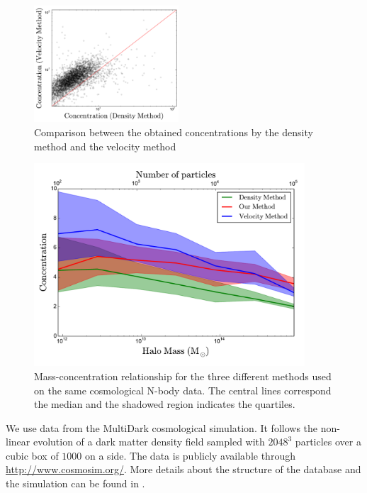 \documentclass[useAMS,usenatbib]{mn2e}
\newcommand{\hMpc}{{\ifmmode{h^{-1}{\rm Mpc}}\else{$h^{-1}$Mpc }\fi}}
\begin{document}
\begin{figure}
  \begin{center}
    \includegraphics[width=0.48\textwidth]{density-velocity.pdf}
  \end{center}
  \caption{Comparison between the obtained concentrations by the density method and the velocity method
  \label{fig:mdv}}
\end{figure}

\begin{figure}
\begin{center}
  \includegraphics[width=0.90\textwidth]{concentration.pdf}
\end{center}
\caption{Mass-concentration relationship for the three different
  methods used on the same cosmological N-body data. The central lines
  correspond the median and the shadowed region indicates the
  quartiles.
    \label{fig:concentrations}}
\end{figure}



We use data from the MultiDark cosmological simulation.
It follows the non-linear evolution of a dark matter density field
sampled with $2048^3$ particles over a cubic box of $1000$ \hMpc on a side.
The data is publicly available through \url{http://www.cosmosim.org/}.
More details about the structure of the database and the simulation
can be found in \citep{2013AN....334..691R}.
\end{document}
